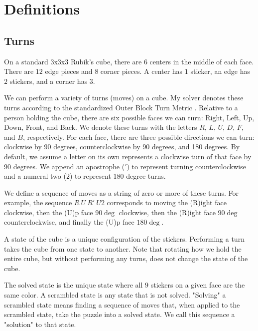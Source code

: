 \documentclass{article}
\begin{document}
\section{Definitions}

\subsection{Turns}
On a standard 3x3x3 Rubik's cube, there are $6$ centers in the middle of each face. There are $12$ edge pieces and $8$ corner pieces. A center has $1$ sticker, an edge has $2$ stickers, and a corner has $3$.

We can perform a variety of turns (moves) on a cube. My solver denotes these turns according to the standardized Outer Block Turn Metric \cite{wca-regs}. Relative to a person holding the cube, there are six possible faces we can turn: Right, Left, Up, Down, Front, and Back. We denote these turns with the letters $R$, $L$, $U$, $D$, $F$, and $B$, respectively. For each face, there are three possible directions we can turn: clockwise by 90 degrees, counterclockwise by 90 degrees, and 180 degrees. By default, we assume a letter on its own represents a clockwise turn of that face by 90 degrees. We append an apostrophe ($'$) to represent turning counterclockwise and a numeral two ($2$) to represent 180 degree turns.

We define a sequence of moves as a string of zero or more of these turns. For example, the sequence $R\ U\ R'\ U2$ corresponds to moving the (R)ight face clockwise, then the (U)p face $90 \deg$ clockwise, then the (R)ight face $90 \deg$ counterclockwise, and finally the (U)p face $180 \deg$.

A state of the cube is a unique configuration of the stickers. Performing a turn takes the cube from one state to another. Note that rotating how we hold the entire cube, but without performing any turns, does not change the state of the cube.

The solved state is the unique state where all $9$ stickers on a given face are the same color. A scrambled state is any state that is not solved. "Solving" a scrambled state means finding a sequence of moves that, when applied to the scrambled state, take the puzzle into a solved state. We call this sequence a "solution" to that state.

\end{document}

